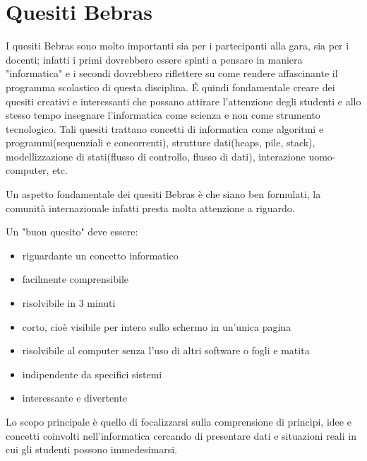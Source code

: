 \documentclass[12pt]{report}
\begin{document}
\section{Quesiti Bebras}
I quesiti Bebras sono molto importanti sia per i partecipanti alla gara, sia per i docenti; infatti i primi dovrebbero essere spinti a pensare in maniera "informatica" e i secondi dovrebbero riflettere su come rendere affascinante il programma scolastico di questa disciplina. \'{E} quindi fondamentale creare dei quesiti creativi e interessanti che possano attirare l'attenzione degli studenti e allo stesso tempo insegnare l'informatica come scienza e non come strumento tecnologico.
Tali quesiti trattano concetti di informatica come algoritmi e programmi(sequenziali e concorrenti), strutture dati(heaps, pile, stack), modellizzazione di stati(flusso di controllo, flusso di dati), interazione uomo-computer, etc.

Un aspetto fondamentale dei quesiti Bebras è che siano ben formulati, la comunità internazionale infatti presta molta attenzione a riguardo.

Un "buon quesito" deve essere:
\begin{itemize}
	\item riguardante un concetto informatico
	\item facilmente comprensibile
	\item risolvibile in 3 minuti
	\item corto, cioè visibile per intero sullo schermo in un'unica pagina
	\item risolvibile al computer senza l'uso di altri software o fogli e matita
	\item indipendente da specifici sistemi
	\item interessante e divertente
\end{itemize}
Lo scopo principale è quello di focalizzarsi sulla comprensione di princìpi, idee e concetti coinvolti nell'informatica cercando di presentare dati e situazioni reali in cui gli studenti possono immedesimarsi.
\end{document}

